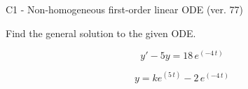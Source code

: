 \begin{exercise}
  \begin{exerciseTitle}C1 - Non-homogeneous first-order linear ODE (ver. 77)\end{exerciseTitle}
  \begin{exerciseStatement}
    
Find the general solution to the given ODE.

    
\[y'-5y= 18 \, e^{\left(-4 \, t\right)}\]

  \end{exerciseStatement}
  \begin{exerciseAnswer}
    
\[y= k e^{\left(5 \, t\right)} - 2 \, e^{\left(-4 \, t\right)}\]

  \end{exerciseAnswer}
\end{exercise}